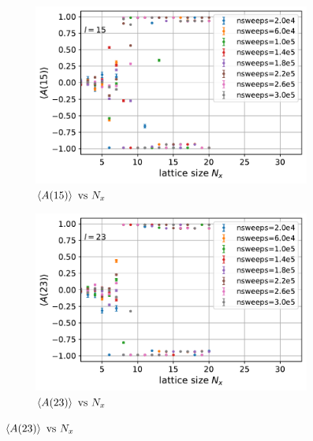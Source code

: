\documentclass[../journal_main.tex]{subfiles}
\begin{document}
\begin{figure}[!htb]\ContinuedFloat
    \centering
    \begin{subfigure}[b]{0.47\textwidth}  %
        \centering
        \includegraphics[width=\textwidth]{images/expval(A_l)_vs_N_x/A vs N_x (l=15).pdf}
        \caption{$\expval{A(15)} \text{ vs } N_x$}
    \end{subfigure}
    \hspace{1em}  %
    \vspace{1em}
    \begin{subfigure}[b]{0.47\textwidth}
        \centering
        \includegraphics[width=\textwidth]{images/expval(A_l)_vs_N_x/A vs N_x (l=23).pdf}
        \caption{$\expval{A(23)} \text{ vs } N_x$}
    \end{subfigure}
    \hspace{1em}  %
    \vspace{1em}

\end{figure}
\end{document}
